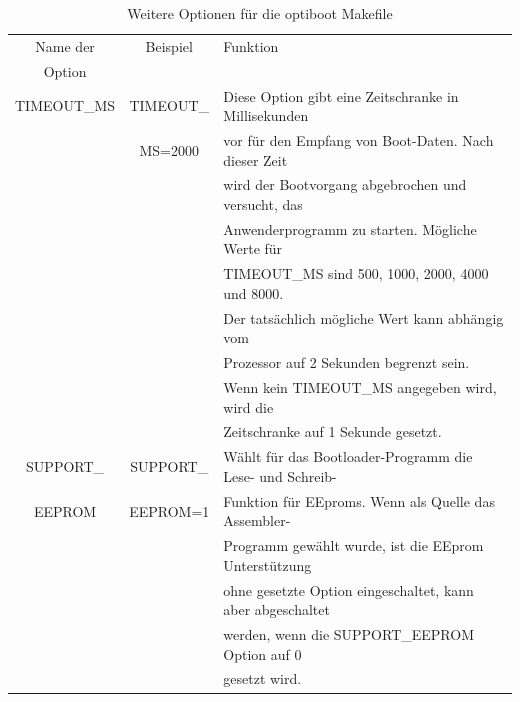 \begin{table}[H]
  \begin{center}
    \begin{tabular}{| c | c | l |}
    \hline
   Name der        & Beispiel       & Funktion                                            \\
    Option         &                &                                                     \\
    \hline
    \hline
 TIMEOUT\_MS       & TIMEOUT\_      & Diese Option gibt eine Zeitschranke in Millisekunden \\
                   &  MS=2000       & vor für den Empfang von Boot-Daten. Nach dieser Zeit\\
                   &                & wird der Bootvorgang abgebrochen und versucht, das \\
                   &                & Anwenderprogramm zu starten. Mögliche Werte für \\
                   &                & TIMEOUT\_MS sind 500, 1000, 2000, 4000 und 8000. \\
                   &                & Der tatsächlich mögliche Wert kann abhängig vom \\
                   &                & Prozessor auf 2 Sekunden begrenzt sein. \\
                   &                & Wenn kein TIMEOUT\_MS angegeben wird, wird die \\
                   &                & Zeitschranke auf 1 Sekunde gesetzt. \\
    \hline
    SUPPORT\_      & SUPPORT\_      & Wählt für das Bootloader-Programm die Lese- und Schreib- \\
    EEPROM         &  EEPROM=1      & Funktion für EEproms. Wenn als Quelle das Assembler- \\
                   &                & Programm gewählt wurde, ist die EEprom Unterstützung \\
                   &                & ohne gesetzte Option eingeschaltet, kann aber abgeschaltet\\
                   &                & werden, wenn die SUPPORT\_EEPROM Option auf 0 \\
                   &                & gesetzt wird. \\
    \hline
    \end{tabular}
  \end{center}
  \caption{Weitere Optionen für die optiboot Makefile}
  \label{tab:options2}
\end{table}

